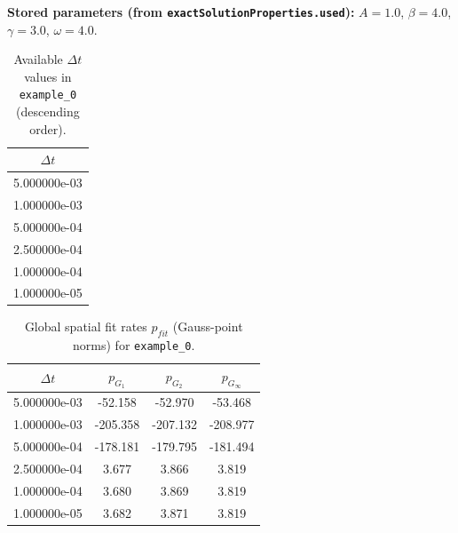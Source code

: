 \documentclass[11pt,a4paper]{article}
\begin{document}
\textbf{Stored parameters (from \texttt{exactSolutionProperties.used}):} $A=1.0$, $\beta=4.0$, $\gamma=3.0$, $\omega=4.0$.
\begin{table}[htbp]
\centering
\small
\caption{Available $\Delta t$ values in \texttt{example\_0} (descending order).}
\begin{tabular}{c}
\toprule
$\Delta t$ \\
\midrule
5.000000e-03 \\
1.000000e-03 \\
5.000000e-04 \\
2.500000e-04 \\
1.000000e-04 \\
1.000000e-05 \\
\bottomrule
\end{tabular}
\end{table}
\begin{table}[htbp]
\centering
\scriptsize
\caption{Global spatial fit rates $p_{fit}$ (cell-centered norms) for \texttt{example\_0}.}
\end{table}
\begin{table}[htbp]
\centering
\scriptsize
\caption{Global spatial fit rates $p_{fit}$ (Gauss-point norms) for \texttt{example\_0}.}
\begin{tabular}{cccc}
\toprule
$\Delta t$ & $p_{G_1}$ & $p_{G_2}$ & $p_{G_\infty}$ \\
\midrule
5.000000e-03 & -52.158 & -52.970 & -53.468 \\
1.000000e-03 & -205.358 & -207.132 & -208.977 \\
5.000000e-04 & -178.181 & -179.795 & -181.494 \\
2.500000e-04 & 3.677 & 3.866 & 3.819 \\
1.000000e-04 & 3.680 & 3.869 & 3.819 \\
1.000000e-05 & 3.682 & 3.871 & 3.819 \\
\bottomrule
\end{tabular}
\end{table}
\end{document}
